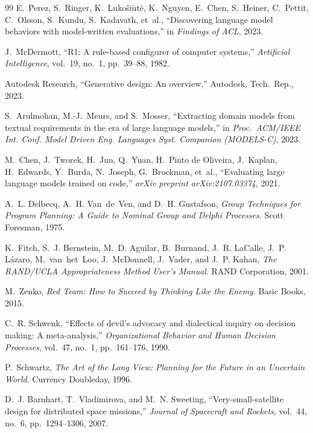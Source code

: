 \documentclass[11pt,a4paper]{article}
\begin{document}
\begin{thebibliography}{99}
E.~Perez, S.~Ringer, K.~Luko\v{s}i\={u}t\.{e}, K.~Nguyen, E.~Chen, S.~Heiner, C.~Pettit, C.~Olsson, S.~Kundu, S.~Kadavath, et~al., ``Discovering language model behaviors with model-written evaluations,'' in \emph{Findings of ACL}, 2023.

J.~McDermott, ``R1: A rule-based configurer of computer systems,'' \emph{Artificial Intelligence}, vol.~19, no.~1, pp.~39--88, 1982.

Autodesk Research, ``Generative design: An overview,'' Autodesk, Tech.\ Rep., 2023.

S.~Arulmohan, M.-J.~Meurs, and S.~Mosser, ``Extracting domain models from textual requirements in the era of large language models,'' in \emph{Proc.\ ACM/IEEE Int. Conf. Model Driven Eng. Languages Syst. Companion (MODELS-C)}, 2023.

M.~Chen, J.~Tworek, H.~Jun, Q.~Yuan, H.~Pinto de Oliveira, J.~Kaplan, H.~Edwards, Y.~Burda, N.~Joseph, G.~Brockman, et~al., ``Evaluating large language models trained on code,'' \emph{arXiv preprint arXiv:2107.03374}, 2021.

A.~L. Delbecq, A.~H. Van~de~Ven, and D.~H. Gustafson, \emph{Group Techniques for Program Planning: A Guide to Nominal Group and Delphi Processes}. Scott Foresman, 1975.

K.~Fitch, S.~J. Bernstein, M.~D. Aguilar, B.~Burnand, J.~R. LaCalle, J.~P. L\'{a}zaro, M.~van~het~Loo, J.~McDonnell, J.~Vader, and J.~P. Kahan, \emph{The RAND/UCLA Appropriateness Method User's Manual}. RAND Corporation, 2001.

M.~Zenko, \emph{Red Team: How to Succeed by Thinking Like the Enemy}. Basic Books, 2015.

C.~R. Schwenk, ``Effects of devil's advocacy and dialectical inquiry on decision making: A meta-analysis,'' \emph{Organizational Behavior and Human Decision Processes}, vol.~47, no.~1, pp.~161--176, 1990.

P.~Schwartz, \emph{The Art of the Long View: Planning for the Future in an Uncertain World}. Currency Doubleday, 1996.

D.~J. Barnhart, T.~Vladimirova, and M.~N. Sweeting, ``Very-small-satellite design for distributed space missions,'' \emph{Journal of Spacecraft and Rockets}, vol.~44, no.~6, pp.~1294--1306, 2007.


\end{thebibliography}
\end{document}
